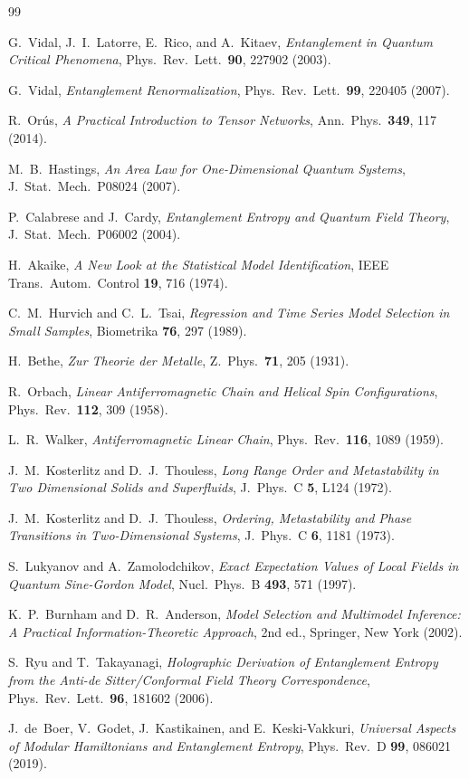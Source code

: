 \documentclass[11pt,letterpaper]{article}
\begin{document}
\begin{thebibliography}{99}

G.~Vidal, J.~I.~Latorre, E.~Rico, and A.~Kitaev,
\textit{Entanglement in Quantum Critical Phenomena},
Phys.\ Rev.\ Lett.\ \textbf{90}, 227902 (2003).

G.~Vidal,
\textit{Entanglement Renormalization},
Phys.\ Rev.\ Lett.\ \textbf{99}, 220405 (2007).

R.~Or\'us,
\textit{A Practical Introduction to Tensor Networks},
Ann.\ Phys.\ \textbf{349}, 117 (2014).

M.~B.~Hastings,
\textit{An Area Law for One-Dimensional Quantum Systems},
J.~Stat.\ Mech.\ P08024 (2007).

P.~Calabrese and J.~Cardy,
\textit{Entanglement Entropy and Quantum Field Theory},
J.~Stat.\ Mech.\ P06002 (2004).

H.~Akaike,
\textit{A New Look at the Statistical Model Identification},
IEEE Trans.\ Autom.\ Control \textbf{19}, 716 (1974).

C.~M.~Hurvich and C.~L.~Tsai,
\textit{Regression and Time Series Model Selection in Small Samples},
Biometrika \textbf{76}, 297 (1989).

H.~Bethe,
\textit{Zur Theorie der Metalle},
Z.~Phys.\ \textbf{71}, 205 (1931).

R.~Orbach,
\textit{Linear Antiferromagnetic Chain and Helical Spin Configurations},
Phys.\ Rev.\ \textbf{112}, 309 (1958).

L.~R.~Walker,
\textit{Antiferromagnetic Linear Chain},
Phys.\ Rev.\ \textbf{116}, 1089 (1959).

J.~M.~Kosterlitz and D.~J.~Thouless,
\textit{Long Range Order and Metastability in Two Dimensional Solids and
Superfluids},
J.~Phys.\ C \textbf{5}, L124 (1972).

J.~M.~Kosterlitz and D.~J.~Thouless,
\textit{Ordering, Metastability and Phase Transitions in Two-Dimensional
Systems},
J.~Phys.\ C \textbf{6}, 1181 (1973).

S.~Lukyanov and A.~Zamolodchikov,
\textit{Exact Expectation Values of Local Fields in Quantum Sine-Gordon Model},
Nucl.\ Phys.\ B \textbf{493}, 571 (1997).

K.~P.~Burnham and D.~R.~Anderson,
\textit{Model Selection and Multimodel Inference: A Practical
Information-Theoretic Approach}, 2nd ed.,
Springer, New York (2002).

S.~Ryu and T.~Takayanagi,
\textit{Holographic Derivation of Entanglement Entropy from the Anti-de Sitter/Conformal Field Theory Correspondence},
Phys.\ Rev.\ Lett.\ \textbf{96}, 181602 (2006).

J.~de~Boer, V.~Godet, J.~Kastikainen, and E.~Keski-Vakkuri,
\textit{Universal Aspects of Modular Hamiltonians and Entanglement Entropy},
Phys.\ Rev.\ D \textbf{99}, 086021 (2019).

\end{thebibliography}
\end{document}

